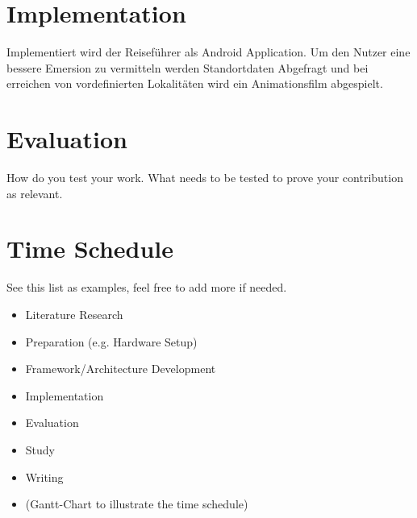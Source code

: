 \documentclass[]{hci-proposal}
\begin{document}
\section{Implementation}
Implementiert wird der Reiseführer als Android Application. Um den Nutzer eine bessere Emersion  zu vermitteln werden Standortdaten Abgefragt und bei erreichen von vordefinierten Lokalitäten wird ein Animationsfilm abgespielt.
\section{Evaluation}
How do you test your work.
What needs to be tested to prove your contribution as relevant.

\section{Time Schedule}
See this list as examples, feel free to add more if needed.
\begin{itemize}
\item Literature Research
\item Preparation (e.g. Hardware Setup)
\item Framework/Architecture Development
\item Implementation
\item Evaluation
\item Study
\item Writing
\item (Gantt-Chart to illustrate the time schedule)
\end{itemize}

\end{document}
